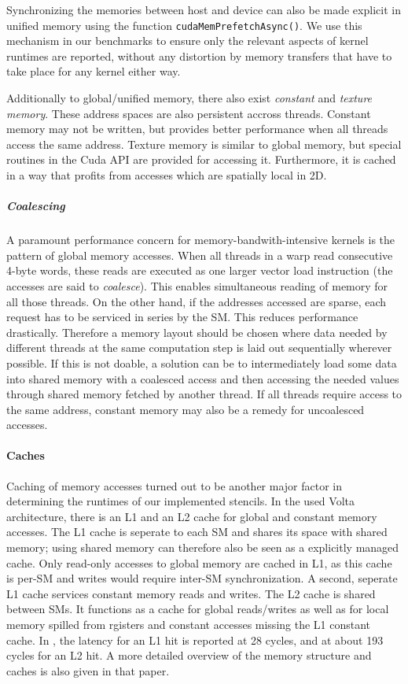 Synchronizing the memories between host and device can also be made explicit in unified memory using the function \texttt{cudaMemPrefetchAsync()}. We use this mechanism in our benchmarks to ensure only the relevant aspects of kernel runtimes are reported, without any distortion by memory transfers that have to take place for any kernel either way.

Additionally to global/unified memory, there also exist \emph{constant} and \emph{texture memory}. These address spaces are also persistent accross threads. Constant memory may not be written, but provides better performance when all threads access the same address. Texture memory is similar to global memory, but special routines in the Cuda API are provided for accessing it. Furthermore, it is cached in a way that profits from accesses which are spatially local in 2D.

\subparagraph{Coalescing} A paramount performance concern for memory-bandwith-intensive kernels is the pattern of global memory accesses. When all threads in a warp read consecutive 4-byte words, these reads are executed as one larger vector load instruction (the accesses are said to \emph{coalesce}). This enables simultaneous reading of memory for all those threads. On the other hand, if the addresses accessed are sparse, each request has to be serviced in series by the SM. This reduces performance drastically. Therefore a memory layout should be chosen where data needed by different threads at the same computation step is laid out sequentially wherever possible. If this is not doable, a solution can be to intermediately load some data into shared memory with a coalesced access and then accessing the needed values through shared memory fetched by another thread. If all threads require access to the same address, constant memory may also be a remedy for uncoalesced accesses.

\paragraph{Caches} Caching of memory accesses turned out to be another major factor in determining the runtimes of our implemented stencils. In the used Volta architecture, there is an L1 and an L2 cache for global and constant memory accesses. The L1 cache is seperate to each SM and shares its space with shared memory; using shared memory can therefore also be seen as a explicitly managed cache. Only read-only accesses to global memory are cached in L1, as this cache is per-SM and writes would require inter-SM synchronization. A second, seperate L1 cache services constant memory reads and writes. The L2 cache is shared between SMs. It functions as a cache for global reads/writes as well as for local memory spilled from rgisters and constant accesses missing the L1 constant cache. In \cite[Chapter 3]{dissecting}, the latency for an L1 hit is reported at 28 cycles, and at about 193 cycles for an L2 hit. A more detailed overview of the memory structure and caches is also given in that paper.

